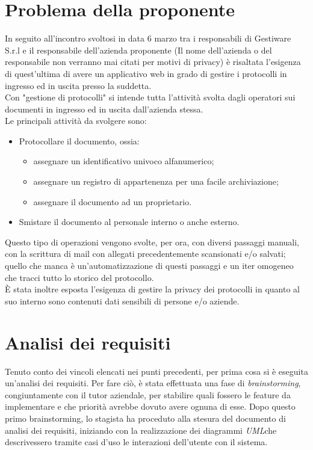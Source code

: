 \section{Problema della proponente}
In seguito all'incontro svoltosi in data 6 marzo tra i responsabili di Gestiware S.r.l e il responsabile dell'azienda proponente (Il nome dell'azienda o del responsabile non verranno mai citati per motivi di privacy) è risaltata l'esigenza di quest'ultima di avere un applicativo web in grado di gestire i protocolli in ingresso ed in uscita presso la suddetta. 
\\
Con "gestione di protocolli" si intende tutta l'attività svolta dagli operatori sui documenti in ingresso ed in uscita dall'azienda stessa.
\\
Le principali attività da svolgere sono:
\begin{itemize}
    \item Protocollare il documento, ossia:
        \begin{itemize}
            \item assegnare un identificativo univoco alfanumerico;
            
            \item assegnare un registro di appartenenza per una facile archiviazione;
            
            \item assegnare il documento ad un proprietario.
        \end{itemize}
    \item Smistare il documento al personale interno o anche esterno.
\end{itemize}
Questo tipo di operazioni vengono svolte, per ora, con diversi passaggi manuali, con la scrittura di mail con allegati precedentemente scansionati e/o salvati; quello che manca è un'automatizzazione di questi passaggi e un iter omogeneo che tracci tutto lo storico del protocollo.
\\
È stata inoltre esposta l'esigenza di gestire la privacy dei protocolli in quanto al suo interno sono contenuti dati sensibili di persone e/o aziende. 

\section{Analisi dei requisiti}
Tenuto conto dei vincoli elencati nei punti precedenti, per prima cosa si è eseguita un'analisi dei requisiti. Per fare ciò, è stata effettuata una fase di \emph{brainstorming}\glsfirstoccur, congiuntamente con il tutor aziendale, per stabilire quali fossero le feature da implementare e che priorità avrebbe dovuto avere ognuna di esse. Dopo questo primo brainstorming, lo stagista ha proceduto alla stesura del documento di analisi dei requisiti, iniziando con la realizzazione dei diagrammi \emph{UML}\glsfirstoccur che descrivessero tramite casi d'uso le interazioni dell'utente con il sistema.

